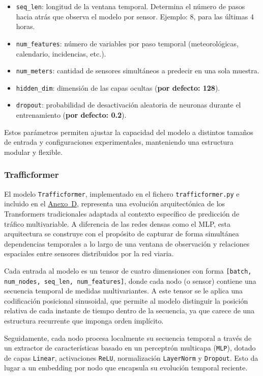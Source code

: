 \begin{itemize}
	\item \texttt{seq\_len}: longitud de la ventana temporal. Determina el número de pasos hacia atrás que observa el modelo por sensor. Ejemplo: 8, para las últimas 4 horas.
	\item \texttt{num\_features}: número de variables por paso temporal (meteorológicas, calendario, incidencias, etc.).
	\item \texttt{num\_meters}: cantidad de sensores simultáneos a predecir en una sola muestra.
	\item \texttt{hidden\_dim}: dimensión de las capas ocultas (\textbf{por defecto: 128}).
	\item \texttt{dropout}: probabilidad de desactivación aleatoria de neuronas durante el entrenamiento (\textbf{por defecto: 0.2}).
\end{itemize}

Estos parámetros permiten ajustar la capacidad del modelo a distintos tamaños de entrada y configuraciones experimentales, manteniendo una estructura modular y flexible.

\subsubsection{Trafficformer}

El modelo \texttt{Trafficformer}, implementado en el fichero \texttt{trafficformer.py} e incluido en el \hyperref[anexo:codigo_trafficformer]{Anexo~D}, representa una evolución arquitectónica de los Transformers tradicionales adaptada al contexto específico de predicción de tráfico multivariable. A diferencia de las redes densas como el MLP, esta arquitectura se construye con el propósito de capturar de forma simultánea dependencias temporales a lo largo de una ventana de observación y relaciones espaciales entre sensores distribuidos por la red viaria.

Cada entrada al modelo es un tensor de cuatro dimensiones con forma \texttt{[batch, num\_nodes, seq\_len, num\_features]}, donde cada nodo (o sensor) contiene una secuencia temporal de medidas multivariantes. A este tensor se le aplica una codificación posicional sinusoidal, que permite al modelo distinguir la posición relativa de cada instante de tiempo dentro de la secuencia, ya que carece de una estructura recurrente que imponga orden implícito.

Seguidamente, cada nodo procesa localmente su secuencia temporal a través de un extractor de características basado en un perceptrón multicapa (\texttt{MLP}), dotado de capas \texttt{Linear}, activaciones \texttt{ReLU}, normalización \texttt{LayerNorm} y \texttt{Dropout}. Esto da lugar a un embedding por nodo que encapsula su evolución temporal reciente.

